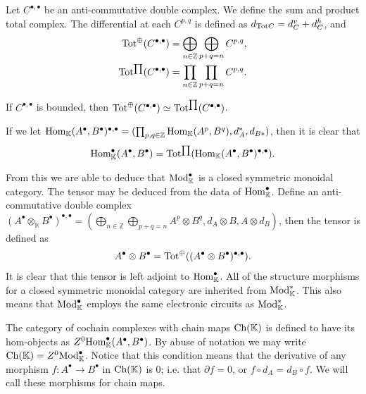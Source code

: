 \documentclass[../thesis.tex]{subfiles}
\begin{document}
            \begin{definition}
                Let $C^{\bullet, \bullet}$ be an anti-commutative double complex. We define the sum and product total complex. The differential at each $C^{p,q}$ is defined as $d_{\tt{Tot}C} = d^v_C + d^h_C$, and
                \begin{align*}
                    \tt{Tot}^{\oplus}(C^{\bullet, \bullet}) & = \bigoplus_{n\in\mathbb{Z}}\bigoplus_{p+q=n}C^{p,q}\tt{,} \\
                    \tt{Tot}^{\prod}(C^{\bullet, \bullet}) & = \prod_{n\in \mathbb{Z}}\prod_{p+q=n}C^{p,q}\tt{.}
                \end{align*}
            \end{definition}
            
            If $C^{\bullet, \bullet}$ is bounded, then $\tt{Tot}^\oplus(C^{\bullet, \bullet}) \simeq \tt{Tot}^{\prod}(C^{\bullet, \bullet})$.

            If we let $\tt{Hom}_\mathbb{K}(A^\bullet, B^\bullet)^{\bullet, \bullet} = (\prod_{p,q\in\mathbb{Z}}\tt{Hom}_\mathbb{K}(A^p,B^q), d_A^*, d_{B*})$, then it is clear that
            \begin{align*}
                \tt{Hom}_\mathbb{K}^\bullet(A^\bullet,B^\bullet) = \tt{Tot}^{\prod}(\tt{Hom}_\mathbb{K}(A^\bullet, B^\bullet)^{\bullet, \bullet})\tt{.}
            \end{align*}

            From this we are able to deduce that $\tt{Mod}_\mathbb{K}^\bullet$ is a closed symmetric monoidal category. The tensor may be deduced from the data of $\tt{Hom}_\mathbb{K}^\bullet$. Define an anti-commutative double complex $(A^\bullet \otimes_\mathbb{K} B^\bullet)^{\bullet, \bullet} = (\bigoplus_{n\in\mathbb{Z}}\bigoplus_{p+q=n}A^p\otimes B^q, d_A\otimes B,A\otimes d_B)$, then the tensor is defined as
            \begin{align*}
                A^\bullet \otimes B^\bullet = \tt{Tot}^\oplus((A^\bullet \otimes B^\bullet)^{\bullet, \bullet})\tt{.}
            \end{align*}
            It is clear that this tensor is left adjoint to $\tt{Hom}_\mathbb{K}^\bullet$. All of the structure morphisms for a closed symmetric monoidal category are inherited from $\tt{Mod}_\mathbb{K}^*$. This also means that $\tt{Mod}_\mathbb{K}^\bullet$ employs the same electronic circuits as $\tt{Mod}_\mathbb{K}^*$.

            The category of cochain complexes with chain maps $\tt{Ch}(\mathbb{K})$ is defined to have its hom-objects as $Z^0\tt{Hom}_\mathbb{K}^\bullet(A^\bullet, B^\bullet)$. By abuse of notation we may write $\tt{Ch}(\mathbb{K}) = Z^0\tt{Mod}_\mathbb{K}^\bullet$. Notice that this condition means that the derivative of any morphism $f : A^\bullet \rightarrow B^\bullet$ in $\tt{Ch}(\mathbb{K})$ is $0$; i.e. that $\partial f = 0$, or $f\circ d_A = d_B \circ f$. We will call these morphisms for chain maps.
\end{document}
